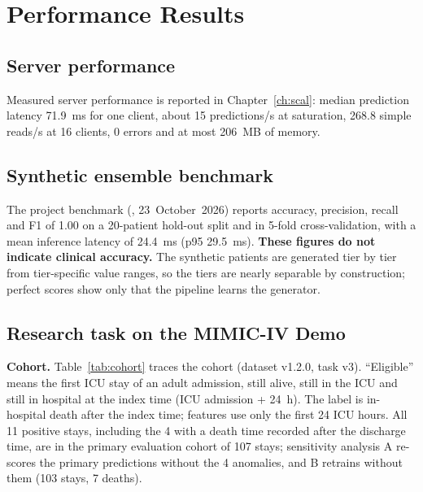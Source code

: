 \section{Performance Results}
\subsection{Server performance}
Measured server performance is reported in Chapter~\ref{ch:scal}: median prediction latency 71.9~ms for one
client, about 15 predictions/s at saturation, 268.8 simple reads/s at 16 clients, 0 errors and at most
206~MB of memory.

\subsection{Synthetic ensemble benchmark}
\label{sec:synthcaveat}
The project benchmark (, 23~October~2026) reports accuracy,
precision, recall and F1 of 1.00 on a 20-patient hold-out split and in 5-fold cross-validation, with a mean
inference latency of 24.4~ms (p95 29.5~ms). \textbf{These figures do not indicate clinical accuracy.} The
synthetic patients are generated tier by tier from tier-specific value ranges, so the tiers are nearly
separable by construction; perfect scores show only that the pipeline learns the generator.

\subsection{Research task on the MIMIC-IV Demo}
\textbf{Cohort.} Table~\ref{tab:cohort} traces the cohort (dataset v1.2.0, task v3). ``Eligible'' means
the first ICU stay of an adult admission, still alive, still in the ICU and still in hospital at the index
time (ICU admission + 24~h). The label is in-hospital death after the index time; features use only the
first 24 ICU hours. All 11 positive stays, including the 4 with a death time recorded after the discharge
time, are in the primary evaluation cohort of 107 stays; sensitivity analysis A re-scores the primary
predictions without the 4 anomalies, and B retrains without them (103 stays, 7 deaths).

